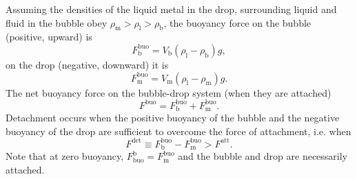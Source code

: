 \documentclass{article}
\begin{document}
Assuming the densities of the liquid metal in the drop, surrounding liquid and
fluid in the bubble obey $\rho_\text{m}>\rho_\text{l}>\rho_\text{b}$,
the buoyancy force on the bubble (positive, upward) is
\begin{equation}
    F^\text{buo}_\text{b} = V_\text{b}(\rho_\text{l}-\rho_\text{b})g,
    \label{eq:buo_b}
\end{equation}
on the drop (negative, downward) it is
\begin{equation}
    F^\text{buo}_\text{m} = V_\text{m}(\rho_\text{l}-\rho_\text{m})g.
    \label{eq:buo_m}
\end{equation}
The net buoyancy force on the bubble-drop system (when they are attached)
\begin{equation}
    F^\text{buo} = F^\text{buo}_\text{b} + F^\text{buo}_\text{m}.
    \label{eq:buo_total}
\end{equation}
Detachment occurs when the positive buoyancy of the bubble and the negative
buoyancy of the drop are sufficient to overcome the force of attachment, i.e.
when
\begin{equation}
    F^\text{det} \equiv F^\text{buo}_\text{b} - F^\text{buo}_\text{m} > F^\text{att}.
    \label{eq:detachment}
\end{equation}
Note that at zero buoyancy, $F_\text{buo}^\text{b} = F_\text{m}^\text{buo}$ and 
the bubble and drop are necessarily attached.
\end{document}
